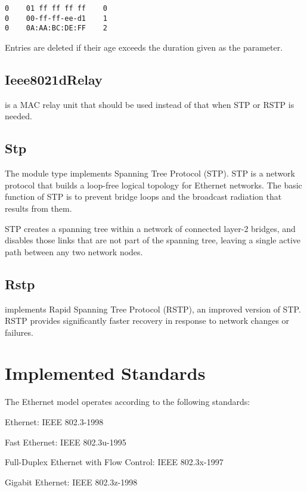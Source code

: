 \begin{verbatim}
0    01 ff ff ff ff    0
0    00-ff-ff-ee-d1    1
0    0A:AA:BC:DE:FF    2
\end{verbatim}

Entries are deleted if their age exceeds the duration given as the  parameter.


\subsection{Ieee8021dRelay}
\label{sec:ethernet:ieee8021drelay}

 is a MAC relay unit that should be used instead
of  that when STP or RSTP is needed.

\subsection{Stp}
\label{sec:ethernet:stp}

The  module type implements Spanning Tree Protocol (STP). STP
is a network protocol that builds a loop-free logical topology for Ethernet
networks. The basic function of STP is to prevent bridge loops and the broadcast
radiation that results from them.

STP creates a spanning tree within a network of connected layer-2 bridges, and
disables those links that are not part of the spanning tree, leaving a single
active path between any two network nodes.


\subsection{Rstp}
\label{sec:ethernet:rstp}

 implements Rapid Spanning Tree Protocol (RSTP), an improved
version of STP. RSTP provides significantly faster recovery in response to
network changes or failures.


\section{Implemented Standards}
\label{sec:ethernet:implemented-standards}

The Ethernet model operates according to the following standards:

\begin{compactitem}
  \item Ethernet: IEEE 802.3-1998
  \item Fast Ethernet: IEEE 802.3u-1995
  \item Full-Duplex Ethernet with Flow Control: IEEE 802.3x-1997
  \item Gigabit Ethernet: IEEE 802.3z-1998
\end{compactitem}


